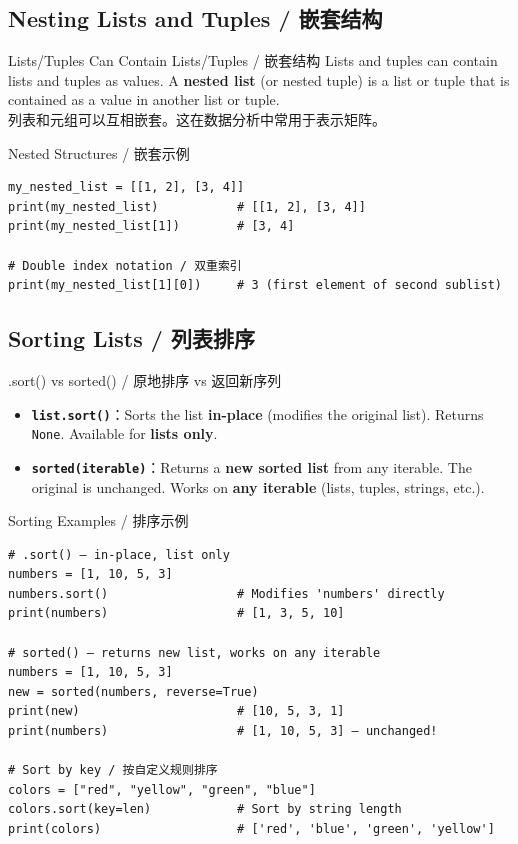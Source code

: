 \documentclass[11pt,a4paper]{article}
\begin{document}
\subsection{Nesting Lists and Tuples / 嵌套结构}

\begin{concept}{Lists/Tuples Can Contain Lists/Tuples / 嵌套结构}
    Lists and tuples can contain lists and tuples as values. A \textbf{nested list} (or nested tuple) is a list or tuple that is contained as a value in another list or tuple. \\
    列表和元组可以互相嵌套。这在数据分析中常用于表示矩阵。
\end{concept}

\begin{examplebox}{Nested Structures / 嵌套示例}
\begin{lstlisting}
my_nested_list = [[1, 2], [3, 4]]
print(my_nested_list)           # [[1, 2], [3, 4]]
print(my_nested_list[1])        # [3, 4]

# Double index notation / 双重索引
print(my_nested_list[1][0])     # 3 (first element of second sublist)
\end{lstlisting}
\end{examplebox}

\subsection{Sorting Lists / 列表排序}

\begin{concept}{.sort() vs sorted() / 原地排序 vs 返回新序列}
    \begin{itemize}[itemsep=0.5em]
        \item \textbf{\texttt{list.sort()}}：Sorts the list \textbf{in-place} (modifies the original list). Returns \texttt{None}. Available for \textbf{lists only}.
        \item \textbf{\texttt{sorted(iterable)}}：Returns a \textbf{new sorted list} from any iterable. The original is unchanged. Works on \textbf{any iterable} (lists, tuples, strings, etc.).
    \end{itemize}
\end{concept}

\begin{examplebox}{Sorting Examples / 排序示例}
\begin{lstlisting}
# .sort() — in-place, list only
numbers = [1, 10, 5, 3]
numbers.sort()                  # Modifies 'numbers' directly
print(numbers)                  # [1, 3, 5, 10]

# sorted() — returns new list, works on any iterable
numbers = [1, 10, 5, 3]
new = sorted(numbers, reverse=True)
print(new)                      # [10, 5, 3, 1]
print(numbers)                  # [1, 10, 5, 3] — unchanged!

# Sort by key / 按自定义规则排序
colors = ["red", "yellow", "green", "blue"]
colors.sort(key=len)            # Sort by string length
print(colors)                   # ['red', 'blue', 'green', 'yellow']
\end{lstlisting}
\end{examplebox}
\end{document}
